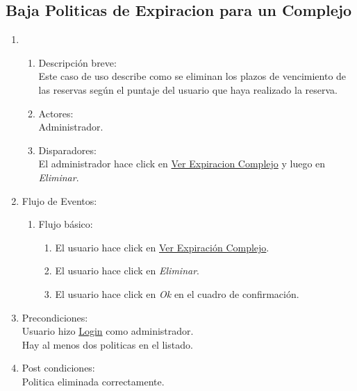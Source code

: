 \documentclass[a4paper,11pt]{article}
\begin{document}
\subsection{Baja Politicas de Expiracion para un Complejo} 
\begin{enumerate}
    \item
    \begin{enumerate}
    \item Descripci\'on breve: \\
        Este caso de uso describe como se eliminan los plazos de vencimiento de
        las reservas seg\'un el puntaje del usuario que haya realizado la reserva.
    \item Actores: \\
        Administrador.
    \item Disparadores: \\
        El administrador hace click en \underline{Ver Expiracion Complejo} y luego en \emph{Eliminar}.
    \end{enumerate}
    \item Flujo de Eventos: 
    \begin{enumerate}
        \item Flujo b\'asico:
		\begin{enumerate}
            		\item El usuario hace click en \underline{Ver Expiraci\'on Complejo}.
            		\item El usuario hace click en \emph{Eliminar}.
			\item El usuario hace click en \emph{Ok} en el cuadro de confirmaci\'on.
		\end{enumerate}
    \end{enumerate}
    \item Precondiciones: \\
        Usuario hizo \underline{Login} como administrador.\\
	Hay al menos dos politicas en el listado.
    \item Post condiciones: \\
        Politica eliminada correctamente.
\end{enumerate}

\end{document}
